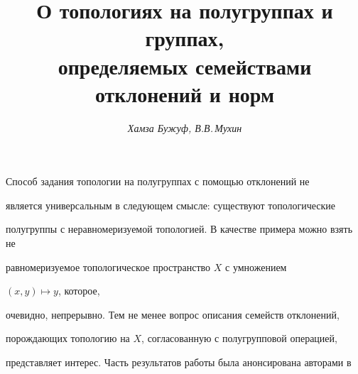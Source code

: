 

 


\renewcommand{\baselinestretch}{1.10} 


 


\setcounter{page}{74} 








\author{\it Хамза Бужуф, В.В.\,Мухин} 


\title{О топологиях на полугруппах и группах,\\ 


определяемых семействами отклонений и норм} 


 


\date{} 


\pagestyle{plain} 


 


 


\maketitle 


 


 


Способ задания топологии на полугруппах с помощью отклонений \cite{Bur} не 


является универсальным в следующем смысле: существуют топологические 


полугруппы с неравномеризуемой топологией. В качестве примера можно взять не 


равномеризуемое топологическое пространство $X$ с умножением 


$(x,y)\mapsto y$, которое, 


очевидно, непрерывно. Тем не менее вопрос описания семейств отклонений, 


порождающих топологию на $X$, согласованную с полугрупповой операцией, 


представляет интерес. Часть результатов работы была анонсирована авторами в 


